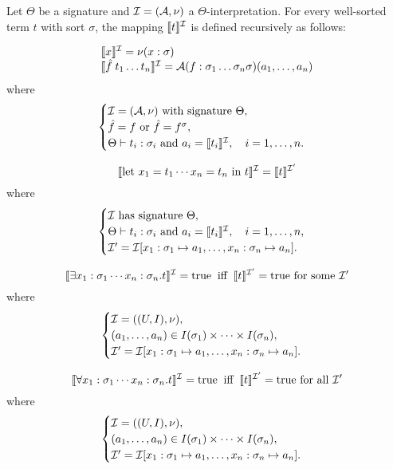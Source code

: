 \begin{definition}\label{def:smt-interpretation}
Let $\Theta$ be a signature and $\cal{I} = (\cal{A}, \nu)$ a $\Theta$-interpretation.  
For every well-sorted term $t$ with sort $\sigma$, the mapping $\llbracket t \rrbracket^{\cal{I}}$ is defined recursively as follows:

\[
\begin{array}{l}
\llbracket x \rrbracket^{\cal{I}} = \nu(x : \sigma) \\
\llbracket \hat{f}\; t_1 \dots t_n \rrbracket^{\cal{I}}= \cal{A}(f : \sigma_1 \dots \sigma_n \sigma)(a_1, \dots, a_n)
\end{array}
\]
where
\[
\begin{cases}
   \cal{I} = (\cal{A}, \nu) \text{ with signature } \Theta, \\
   \hat{f} = f \text{ or } \hat{f} = f^{\sigma}, \\
   \Theta \vdash t_i : \sigma_i \text{ and } a_i = \llbracket t_i \rrbracket^{\cal{I}}, \quad i=1,\dots,n.
\end{cases}
\]

\[
\llbracket \text{let } x_1 = t_1 \cdots x_n = t_n \text{ in } t \rrbracket^{\cal{I}}
    = \llbracket t \rrbracket^{\cal{I}'}
\]
where
\[
\begin{cases}
   \cal{I} \text{ has signature } \Theta, \\
   \Theta \vdash t_i : \sigma_i \text{ and } a_i = \llbracket t_i \rrbracket^{\cal{I}}, \quad i=1,\dots,n, \\
   \cal{I}' = \cal{I}[x_1 : \sigma_1 \mapsto a_1, \dots, x_n : \sigma_n \mapsto a_n].
\end{cases}
\]

\[
\llbracket \exists x_1 : \sigma_1 \cdots x_n : \sigma_n . t \rrbracket^{\cal{I}} = \text{true}
\;\;\text{iff}\;\; \llbracket t \rrbracket^{\cal{I}'} = \text{true for some }\cal{I}' 
\]
where
\[
\begin{cases}
   \cal{I} = ((U,I),\nu), \\
   (a_1,\dots,a_n) \in I(\sigma_1) \times \cdots \times I(\sigma_n), \\
   \cal{I}' = \cal{I}[x_1 : \sigma_1 \mapsto a_1, \dots, x_n : \sigma_n \mapsto a_n].
\end{cases}
\]

\[
\llbracket \forall x_1 : \sigma_1 \cdots x_n : \sigma_n . t \rrbracket^{\cal{I}} = \text{true}
\;\;\text{iff}\;\; \llbracket t \rrbracket^{\cal{I}'} = \text{true for all }\cal{I}'
\]
where
\[
\begin{cases}
   \cal{I} = ((U,I),\nu), \\
   (a_1,\dots,a_n) \in I(\sigma_1) \times \cdots \times I(\sigma_n), \\
   \cal{I}' = \cal{I}[x_1 : \sigma_1 \mapsto a_1, \dots, x_n : \sigma_n \mapsto a_n].
\end{cases}
\]
\end{definition}

